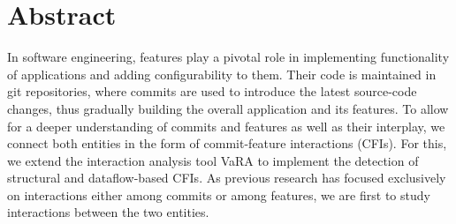 \begingroup
\let\clearpage\relax
\let\cleardoublepage\relax
\let\cleardoublepage\relax

\chapter*{Abstract}

In software engineering, features play a pivotal role in implementing functionality of applications and adding configurability to them.
Their code is maintained in git repositories, where commits are used to introduce the latest source-code changes, thus gradually building the overall application and its features.
To allow for a deeper understanding of commits and features as well as their interplay, we connect both entities in the form of commit-feature interactions (CFIs). 
For this, we extend the interaction analysis tool VaRA to implement the detection of structural and dataflow-based CFIs.
As previous research has focused exclusively on interactions either among commits or among features, we are first to study interactions between the two entities.

\vfill

\endgroup

\vfill

